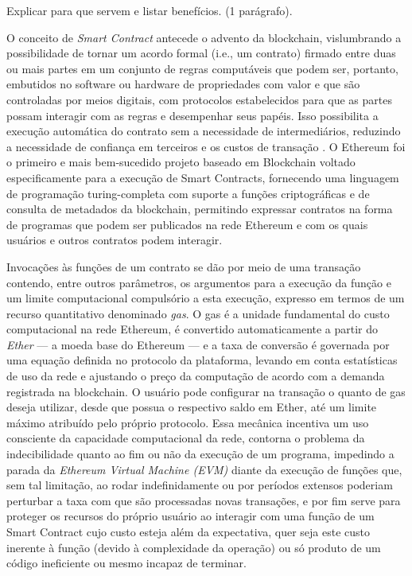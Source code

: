 \documentclass[a4paper,11pt]{article}
\begin{document}
{\color{ForestGreen}Explicar para que servem e listar benefícios. (1 parágrafo).}

O conceito de \emph{Smart Contract} antecede o advento da blockchain, vislumbrando a possibilidade de tornar um acordo formal (i.e., um contrato) firmado entre duas ou mais partes em um conjunto de regras computáveis que podem ser, portanto, embutidos no software ou hardware de propriedades com valor e que são controladas por meios digitais, com protocolos estabelecidos para que as partes possam interagir com as regras e desempenhar seus papéis.
Isso possibilita a execução automática do contrato sem a necessidade de intermediários, reduzindo a necessidade de confiança em terceiros e os custos de transação \cite{Bartoletti2019, Szabo1996}.
O Ethereum foi o primeiro e mais bem-sucedido projeto baseado em Blockchain voltado especificamente para a execução de Smart Contracts, fornecendo uma linguagem de programação turing-completa com suporte a funções criptográficas e de consulta de metadados da blockchain, permitindo expressar contratos na forma de programas que podem ser publicados na rede Ethereum e com os quais usuários e outros contratos podem interagir.

Invocações às funções de um contrato se dão por meio de uma transação contendo, entre outros parâmetros, os argumentos para a execução da função e um limite computacional compulsório a esta execução, expresso em termos de um recurso quantitativo denominado \emph{gas}.
O gas é a unidade fundamental do custo computacional na rede Ethereum, é convertido automaticamente a partir do \emph{Ether} --- a moeda base do Ethereum --- e a taxa de conversão é governada por uma equação definida no protocolo da plataforma, levando em conta estatísticas de uso da rede e ajustando o preço da computação de acordo com a demanda registrada na blockchain.
O usuário pode configurar na transação o quanto de gas deseja utilizar, desde que possua o respectivo saldo em Ether, até um limite máximo atribuído pelo próprio protocolo.
Essa mecânica incentiva um uso consciente da capacidade computacional da rede, contorna o problema da indecibilidade quanto ao fim ou não da execução de um programa, impedindo a parada da \emph{Ethereum Virtual Machine (EVM)} diante da execução de funções que, sem tal limitação, ao rodar indefinidamente ou por períodos extensos poderiam perturbar a taxa com que são processadas novas transações, e por fim serve para proteger os recursos do próprio usuário ao interagir com uma função de um Smart Contract cujo custo esteja além da expectativa, quer seja este custo inerente à função (devido à complexidade da operação) ou só produto de um código ineficiente ou mesmo incapaz de terminar.
\end{document}
